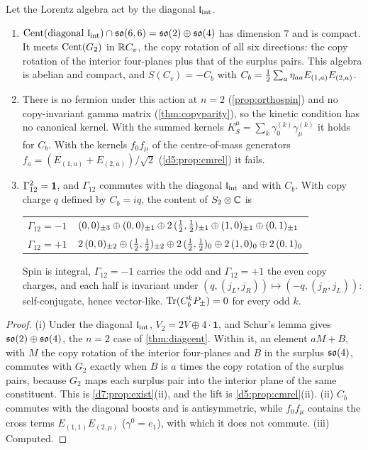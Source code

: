 \begin{proposition}
\label{e5:prop:diagonal}
Let the Lorentz algebra act by the diagonal $\mathfrak l_{\rm int}$.
\begin{enumerate}[label=(\roman*),leftmargin=2.2em]
\item $\operatorname{Cent}(\text{diagonal }\mathfrak l_{\rm int})\cap\mathfrak{so}(6,6)=\mathfrak{so}(2)\oplus\mathfrak{so}(4)$ has dimension $7$ and is compact. It meets $\operatorname{Cent}(G_2)$ in $\mathbb{R} C_v$, the copy
rotation of all six directions: the copy rotation of the interior four-planes plus that of the surplus pairs. This algebra is abelian and compact,
and $S(C_v)=-C_b$ with $C_b=\tfrac12\sum_a\eta_{aa}E_{(1,a)}E_{(2,a)}$.
\item There is no fermion under this action at $n=2$ (\cref{prop:orthospin}) and no copy-invariant gamma matrix (\cref{thm:copyparity}), so the kinetic condition has no canonical kernel. With the summed kernels $K^\mu_S=\sum_k\gamma^{(k)}_0\gamma^{(k)}_\mu$ it holds for
$C_b$. With the kernels $f_0f_\mu$ of the centre-of-mass generators $f_a=(E_{(1,a)}+E_{(2,a)})/\sqrt2$ (\cref{d5:prop:cmrel}) it fails.
\item $\Gamma_{12}^2=\mathbf 1$, and $\Gamma_{12}$ commutes with the diagonal $\mathfrak l_{\rm int}$ and with $C_b$. With copy charge $q$ defined by $C_b=iq$, the content
of $S_2\otimes\mathbb{C}$ is
\begin{center}
\small
\begin{tabular}{@{}ll@{}}
\toprule
$\Gamma_{12}=-1$ & $(0,0)_{\pm3}\oplus(0,0)_{\pm1}\oplus2\,(\tfrac12,\tfrac12)_{\pm1}\oplus(1,0)_{\pm1}\oplus(0,1)_{\pm1}$\\
$\Gamma_{12}=+1$ & $2\,(0,0)_{\pm2}\oplus(\tfrac12,\tfrac12)_{\pm2}\oplus2\,(\tfrac12,\tfrac12)_0\oplus2\,(1,0)_0\oplus2\,(0,1)_0$\\
\bottomrule
\end{tabular}
\end{center}
Spin is integral, $\Gamma_{12}=-1$ carries the odd and $\Gamma_{12}=+1$ the even copy charges, and each half is invariant under
$(q,(j_L,j_R))\mapsto(-q,(j_R,j_L))$: self-conjugate, hence vector-like. $\operatorname{Tr}(C_b^kP_\pm)=0$ for every odd $k$.
\end{enumerate}
\end{proposition}

\begin{proof}
(i) Under the diagonal $\mathfrak l_{\rm int}$, $V_2=2V\oplus4\cdot\mathbf1$, and Schur's lemma gives $\mathfrak{so}(2)\oplus\mathfrak{so}(4)$, the $n=2$ case of \cref{thm:diagcent}. Within it, an element $aM+B$, with $M$ the copy rotation of the interior four-planes and $B$ in the surplus $\mathfrak{so}(4)$, commutes with
$G_2$ exactly when $B$ is $a$ times the copy rotation of the surplus pairs, because $G_2$ maps each surplus pair into the interior plane of the same
constituent. This is \cref{d7:prop:exist}(ii), and the lift is \cref{d5:prop:cmrel}(ii). (ii) $C_b$ commutes with the diagonal boosts and is
antisymmetric, while $f_0f_\mu$ contains the cross terms $E_{(1,1)}E_{(2,\mu)}$ ($\gamma^0=e_1$), with which it does not commute. (iii) Computed.
\end{proof}

